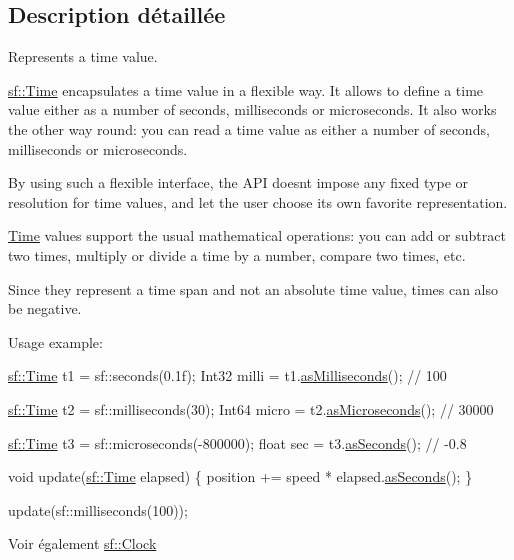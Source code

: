 \subsection{Description détaillée}
Represents a time value. 

\hyperlink{classsf_1_1Time}{sf\+::\+Time} encapsulates a time value in a flexible way. It allows to define a time value either as a number of seconds, milliseconds or microseconds. It also works the other way round\+: you can read a time value as either a number of seconds, milliseconds or microseconds.

By using such a flexible interface, the A\+PI doesn\textquotesingle{}t impose any fixed type or resolution for time values, and let the user choose its own favorite representation.

\hyperlink{classsf_1_1Time}{Time} values support the usual mathematical operations\+: you can add or subtract two times, multiply or divide a time by a number, compare two times, etc.

Since they represent a time span and not an absolute time value, times can also be negative.

Usage example\+: 
\begin{DoxyCode}
\hyperlink{classsf_1_1Time}{sf::Time} t1 = sf::seconds(0.1f);
Int32 milli = t1.\hyperlink{classsf_1_1Time_aa16858ca030a07eb18958c321f256e5a}{asMilliseconds}(); \textcolor{comment}{// 100}

\hyperlink{classsf_1_1Time}{sf::Time} t2 = sf::milliseconds(30);
Int64 micro = t2.\hyperlink{classsf_1_1Time_a000c2c64b74658ebd228b9294a464275}{asMicroseconds}(); \textcolor{comment}{// 30000}

\hyperlink{classsf_1_1Time}{sf::Time} t3 = sf::microseconds(-800000);
\textcolor{keywordtype}{float} sec = t3.\hyperlink{classsf_1_1Time_aa3df2f992d0b0041b4eb02258d43f0e3}{asSeconds}(); \textcolor{comment}{// -0.8}
\end{DoxyCode}



\begin{DoxyCode}
\textcolor{keywordtype}{void} update(\hyperlink{classsf_1_1Time}{sf::Time} elapsed)
\{
   position += speed * elapsed.\hyperlink{classsf_1_1Time_aa3df2f992d0b0041b4eb02258d43f0e3}{asSeconds}();
\}

update(sf::milliseconds(100));
\end{DoxyCode}


\begin{DoxySeeAlso}{Voir également}
\hyperlink{classsf_1_1Clock}{sf\+::\+Clock} 
\end{DoxySeeAlso}


